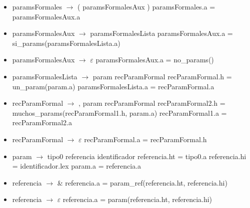 \documentclass[11pt]{article}
\begin{document}
        \begin{itemize}
            \item paramsFormales $\rightarrow$ ( paramsFormalesAux )
                \subitem paramsFormales.a = paramsFormalesAux.a
            \item paramsFormalesAux $\rightarrow$ paramsFormalesLista
                \subitem paramsFormalesAux.a = si\_params(paramsFormalesLista.a)
            \item paramsFormalesAux $\rightarrow$ $\varepsilon$
                \subitem paramsFormalesAux.a = no\_params()
            \item paramsFormalesLista $\rightarrow$ param recParamFormal
                \subitem recParamFormal.h = un\_param(param.a)
                \subitem paramsFormalesLista.a = recParamFormal.a
            \item recParamFormal $\rightarrow$ , param recParamFormal
                \subitem recParamFormal2.h = muchos\_params(recParamFormal1.h, param.a)
                \subitem recParamFormal1.a = recParamFormal2.a
            \item recParamFormal $\rightarrow$ $\varepsilon$
                \subitem recParamFormal.a = recParamFormal.h
            \item param $\rightarrow$ tipo0 referencia identificador
                \subitem referencia.ht = tipo0.a
                \subitem referencia.hi = identificador.lex
                \subitem param.a = referencia.a
            \item referencia $\rightarrow$ \&
                \subitem referencia.a = param\_ref(referencia.ht, referencia.hi)
            \item referencia $\rightarrow$ $\varepsilon$
                \subitem referencia.a = param(referencia.ht, referencia.hi)
        \end{itemize}
        \
\end{document}
